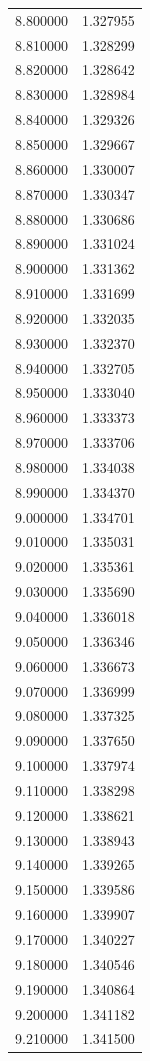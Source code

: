 \begin{tabular}{rr}
8.800000 & 1.327955 \\
8.810000 & 1.328299 \\
8.820000 & 1.328642 \\
8.830000 & 1.328984 \\
8.840000 & 1.329326 \\
8.850000 & 1.329667 \\
8.860000 & 1.330007 \\
8.870000 & 1.330347 \\
8.880000 & 1.330686 \\
8.890000 & 1.331024 \\
8.900000 & 1.331362 \\
8.910000 & 1.331699 \\
8.920000 & 1.332035 \\
8.930000 & 1.332370 \\
8.940000 & 1.332705 \\
8.950000 & 1.333040 \\
8.960000 & 1.333373 \\
8.970000 & 1.333706 \\
8.980000 & 1.334038 \\
8.990000 & 1.334370 \\
9.000000 & 1.334701 \\
9.010000 & 1.335031 \\
9.020000 & 1.335361 \\
9.030000 & 1.335690 \\
9.040000 & 1.336018 \\
9.050000 & 1.336346 \\
9.060000 & 1.336673 \\
9.070000 & 1.336999 \\
9.080000 & 1.337325 \\
9.090000 & 1.337650 \\
9.100000 & 1.337974 \\
9.110000 & 1.338298 \\
9.120000 & 1.338621 \\
9.130000 & 1.338943 \\
9.140000 & 1.339265 \\
9.150000 & 1.339586 \\
9.160000 & 1.339907 \\
9.170000 & 1.340227 \\
9.180000 & 1.340546 \\
9.190000 & 1.340864 \\
9.200000 & 1.341182 \\
9.210000 & 1.341500 \\

\end{tabular}
